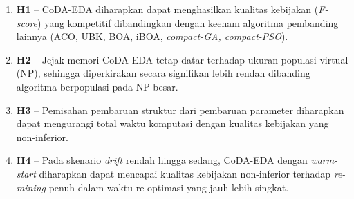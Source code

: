 \begin{enumerate}
    \item \textbf{H1}\label{first:h1} -- CoDA-EDA diharapkan dapat menghasilkan kualitas kebijakan (\textit{F-score}) yang kompetitif dibandingkan dengan keenam algoritma pembanding lainnya (ACO, UBK, BOA, iBOA, \textit{compact-GA, compact-PSO}).
    \item \textbf{H2}\label{first:h2} -- Jejak memori CoDA-EDA tetap datar terhadap ukuran populasi virtual (NP), sehingga diperkirakan secara signifikan lebih rendah dibanding algoritma berpopulasi pada NP besar.
    \item \textbf{H3}\label{first:h3} -- Pemisahan pembaruan struktur dari pembaruan parameter diharapkan dapat mengurangi total waktu komputasi dengan kualitas kebijakan yang non-inferior.
    \item \textbf{H4}\label{first:h4} -- Pada skenario \textit{drift} rendah hingga sedang, CoDA-EDA dengan \textit{warm-start} diharapkan dapat mencapai kualitas kebijakan non-inferior terhadap \textit{re-mining} penuh dalam waktu re-optimasi yang jauh lebih singkat.
\end{enumerate}